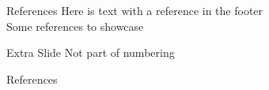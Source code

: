\documentclass[10pt]{beamer}
\begin{document}
\begin{frame}{References}
	Here is text with a reference in the footer \\
	Some references to showcase \cite{Nguyen2015}\\
\end{frame}

\appendix

\begin{frame}{Extra Slide}
	Not part of numbering	
\end{frame}

\begin{frame}[allowframebreaks]{References}

  \printbibliography

\end{frame}
\end{document}
